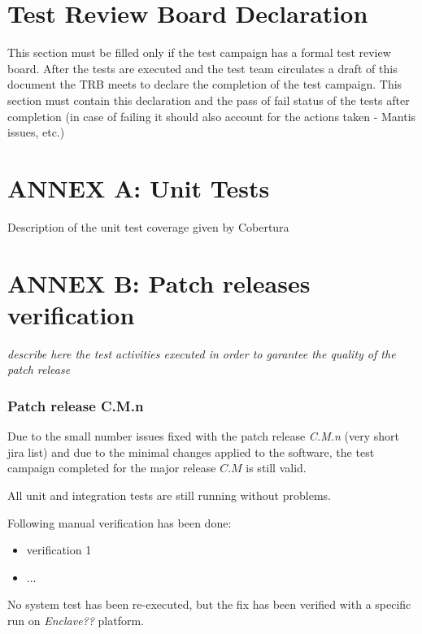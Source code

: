 \documentclass[DM,lsstdraft,STR,toc]{lsstdoc}
\begin{document}
\newpage

\section{Test Review Board Declaration\label{sect:trb}}
This section must be filled only if the test campaign has a  formal
test review board.
After the tests are executed and the test team circulates a draft of
this document the TRB meets to declare the completion of the test campaign.
This section must contain this declaration and the pass of fail status
of the tests after completion (in case of failing it should also account
for the actions taken - Mantis issues, etc.)

\newpage

\appendix
\section{ANNEX A: Unit Tests \label{sect:unit_tests}}
Description of the unit test coverage given by Cobertura

\newpage
\section{ANNEX B: Patch releases verification}

{\it describe here the test activities executed in order to garantee the quality of the patch release}

\subsubsection{Patch release C.M.n}

Due to the small number issues fixed with the {\it \product} patch release {\it C.M.n} (very short jira list)
and due to the minimal changes applied to the software, the test campaign completed for the {\it \product} major
release $C.M$ is still valid.

All unit and integration tests are still running without problems.

Following manual verification has been done:

\begin{itemize}
\item verification 1
\item ...
\end{itemize}

No system test has been re-executed, but the fix has been verified with a specific run
on {\it Enclave??} platform.
\end{document}
